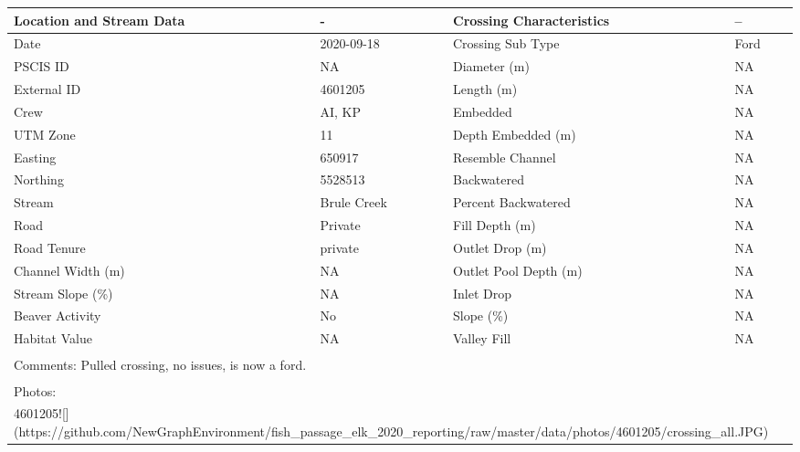 \documentclass[
]{book}
\begin{document}
\begin{tabular}{l|l|l|l}
\hline
Location and Stream Data & - & Crossing Characteristics & --\\
\hline
Date & 2020-09-18 & Crossing Sub Type & Ford\\
\hline
PSCIS ID & NA & Diameter (m) & NA\\
\hline
External ID & 4601205 & Length (m) & NA\\
\hline
Crew & AI, KP & Embedded & NA\\
\hline
UTM Zone & 11 & Depth Embedded (m) & NA\\
\hline
Easting & 650917 & Resemble Channel & NA\\
\hline
Northing & 5528513 & Backwatered & NA\\
\hline
Stream & Brule Creek & Percent Backwatered & NA\\
\hline
Road & Private & Fill Depth (m) & NA\\
\hline
Road Tenure & private & Outlet Drop (m) & NA\\
\hline
Channel Width (m) & NA & Outlet Pool Depth (m) & NA\\
\hline
Stream Slope (\%) & NA & Inlet Drop & NA\\
\hline
Beaver Activity & No & Slope (\%) & NA\\
\hline
Habitat Value & NA & Valley Fill & NA\\
\hline
\multicolumn{4}{l}{\textsuperscript{} Comments: Pulled crossing, no issues, is now a ford.}\\
\multicolumn{4}{l}{\textsuperscript{} Photos:}\\
\multicolumn{4}{l}{4601205![](https://github.com/NewGraphEnvironment/fish\_passage\_elk\_2020\_reporting/raw/master/data/photos/4601205/crossing\_all.JPG)}\\
\end{tabular}
\end{document}
